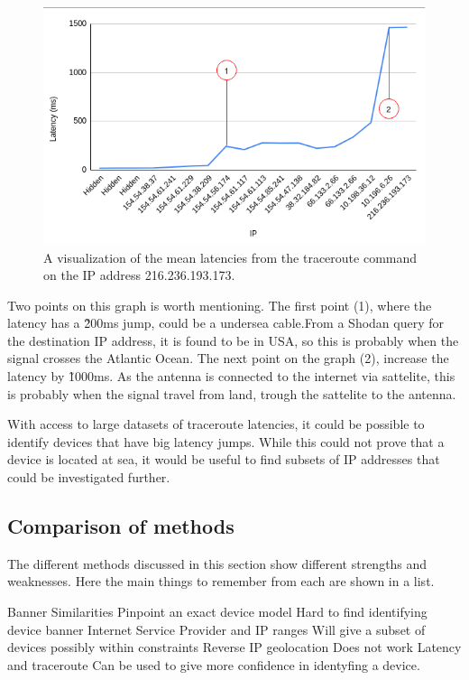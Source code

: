 \begin{figure} [H]
    \centering
    \includegraphics[scale=0.7]{Figurer/latency_graph_marked.png}
    \caption{A visualization of the mean latencies from the traceroute command on the IP address 216.236.193.173.}
    \label{fig:traceroute_graph}
\end{figure}

Two points on this graph is worth mentioning. The first point (1), where the latency has a \~200ms jump, could be a undersea cable.From a Shodan query for the destination IP address, it is found to be in USA, so this is probably when the signal crosses the Atlantic Ocean. The next point on the graph (2), increase the latency by \~1000ms. As the antenna is connected to the internet via sattelite, this is probably when the signal travel from land, trough the sattelite to the antenna.

With access to large datasets of traceroute latencies, it could be possible to identify devices that have big latency jumps. While this could not prove that a device is located at sea, it would be useful to find subsets of IP addresses that could be investigated further.

\subsection{Comparison of methods}
The different methods discussed in this section show different strengths and weaknesses. Here the main things to remember from each are shown in a list.

\begin{outline}[itemize]
        \1 Banner Similarities
            \2 Pinpoint an exact device model
            \2 Hard to find identifying device banner
        \1 Internet Service Provider and IP ranges
            \2 Will give a subset of devices possibly within constraints
        \1 Reverse IP geolocation
            \2 Does not work
        \1 Latency and traceroute
            \2 Can be used to give more confidence in identyfing a device.
\end{outline}

